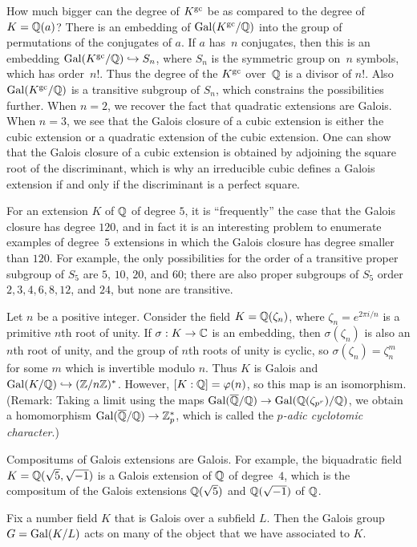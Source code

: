 How much bigger can the degree of $K^{\operatorname{gc}}$ be as compared to the
degree of $K=\mathbb{Q}(a)$? There is an embedding of
$\operatorname{Gal}(K^{\operatorname{gc}}/\mathbb{Q})$ into the group of permutations of the conjugates of
$a$.  If $a$ has~$n$ conjugates, then this is an embedding
$\operatorname{Gal}(K^{\operatorname{gc}}/\mathbb{Q})\hookrightarrow S_n$, where $S_n$ is the symmetric group on~$n$
symbols, which has order~$n!$.  Thus the degree of the $K^{\operatorname{gc}}$ over~$\mathbb{Q}$
is a divisor of $n!$. Also $\operatorname{Gal}(K^{\operatorname{gc}}/\mathbb{Q})$ is a transitive
subgroup of $S_n$, which constrains the possibilities further.  When
$n=2$, we recover the fact that quadratic extensions are Galois.  When
$n=3$, we see that the Galois closure of a cubic extension is either
the cubic extension or a quadratic extension of the cubic extension.
One can show that the Galois closure of a cubic extension is obtained
by adjoining the square root of the discriminant, which is why an
irreducible cubic defines a Galois extension if and only if the discriminant
is a perfect square.


For an extension
$K$ of $\mathbb{Q}$ of degree $5$, it is ``frequently'' the case that the Galois
closure has degree $120$, and in fact it is an
interesting problem to enumerate examples of degree~$5$ extensions in which
the Galois closure has degree smaller than $120$.
For example, the only possibilities for the order of a transitive proper subgroup
of $S_5$ are $5$, $10$, $20$, and $60$; there are also
proper subgroups of $S_5$ order $2, 3, 4, 6, 8, 12$, and $24$, but none
are transitive.

Let $n$ be a positive integer.  Consider the field $K=\mathbb{Q}(\zeta_n)$,
where $\zeta_n=e^{2\pi i/n}$ is a primitive $n$th root of unity.  If
$\sigma:K\to \mathbb{C}$ is an embedding, then $\sigma(\zeta_n)$ is also an
$n$th root of unity, and the group of $n$th roots of unity is cyclic,
so $\sigma(\zeta_n) = \zeta_n^m$ for some $m$ which is invertible
modulo $n$.  Thus $K$ is Galois and $\operatorname{Gal}(K/\mathbb{Q})\hookrightarrow (\mathbb{Z}/n\mathbb{Z})^*$.
However, $[K:\mathbb{Q}]=\varphi(n)$, so this map is an isomorphism.  (Remark:
Taking a limit using the maps $\operatorname{Gal}(\overline{\mathbb{Q}}/\mathbb{Q})\to
\operatorname{Gal}(\mathbb{Q}(\zeta_{p^r})/\mathbb{Q})$, we obtain a homomorphism $\operatorname{Gal}(\overline{\mathbb{Q}}/\mathbb{Q})\to
\mathbb{Z}_p^*$, which is called the {\em $p$-adic cyclotomic character}.)

Compositums of Galois extensions are Galois.  For example, the
biquadratic field $K=\mathbb{Q}(\sqrt{5},\sqrt{-1})$ is a Galois
extension of $\mathbb{Q}$ of degree~$4$, which is the compositum
of the Galois extensions $\mathbb{Q}(\sqrt{5})$ and $\mathbb{Q}(\sqrt{-1})$ of $\mathbb{Q}$.

Fix a number field $K$ that is Galois over a subfield
$L$. Then the Galois group $G=\operatorname{Gal}(K/L)$ acts on many
of the object that we have associated to $K$.

